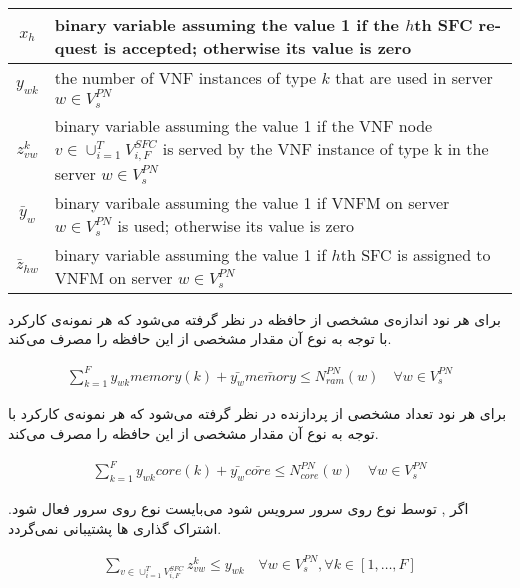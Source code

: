 \begin{center}\begin{latin}\begin{tabular}{|c|p{10cm}|}
    \hline
    $x_h$ & binary variable assuming the value 1 if the $h$th SFC request is accepted; otherwise its value is zero \\
    \hline
    $y_{wk}$ & the number of VNF instances of type $k$ that are used in server $w \in V_s^{PN}$ \\
    \hline
    $z^k_{vw}$ & binary variable assuming the value 1 if the VNF node $v \in \cup_{i=1}^{T} V_{i, F}^{SFC}$ is served by the VNF instance of type k in the server $w \in V_s^{PN}$ \\
    \hline
    $\bar{y}_w$ & binary varibale assuming the value 1 if VNFM on server $w \in V_s^{PN}$ is used; otherwise its value is zero\\
    \hline
    $\bar{z}_{hw}$ & binary variable assuming the value 1 if $h$th SFC is assigned to VNFM on server $w \in V_s^{PN}$\\
    \hline
\end{tabular}\end{latin}\end{center}

برای هر نود اندازه‌ی مشخصی از حافظه 
در نظر گرفته می‌شود که هر نمونه‌ی کارکرد با توجه به نوع آن مقدار مشخصی از این حافظه را مصرف می‌کند.
\begin{latin}\begin{align}
    \sum_{k=1}^F y_{wk} memory(k) + \bar{y_w} \bar{memory} \le N_{ram}^{PN}(w)
    \quad
    \forall w \in V_s^{PN}
\end{align}\end{latin}

برای هر نود تعداد مشخصی از پردازنده در نظر گرفته می‌شود که هر نمونه‌ی کارکرد با توجه به نوع آن مقدار مشخصی از این حافظه را مصرف می‌کند.
\begin{latin}\begin{align}
    \sum_{k=1}^F y_{wk} core(k) + \bar{y_w} \bar{core} \le N_{core}^{PN}(w)
    \quad
    \forall w \in V_s^{PN}
\end{align}\end{latin}

اگر , 
توسط  نوع 
روی سرور  سرویس شود می‌بایست
 نوع 
روی سرور  فعال شود.
اشتراک گذاری ها پشتیبانی نمی‌گردد.
\begin{latin}\begin{align}
\sum_{v \in \cup_{i=1}^T V_{i, F}^{SFC}} z_{vw}^k \le y_{wk}
\quad
\forall w \in V_s^{PN}, \forall k \in [1,\ldots, F]
\end{align}\end{latin}

